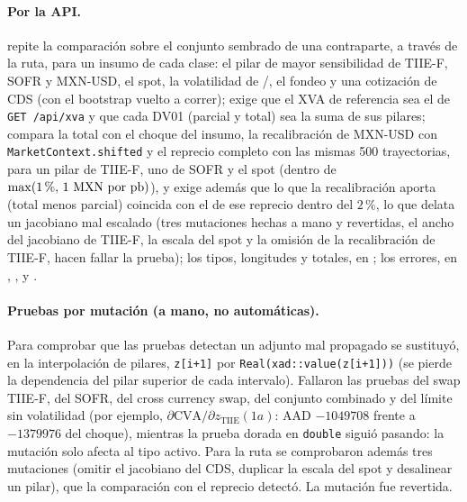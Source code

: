 \begin{sloppypar}
\paragraph{Por la API.} 
repite la comparación sobre el conjunto sembrado de una contraparte, a través de la ruta, para un insumo de cada
clase: el pilar de mayor sensibilidad de TIIE-F, SOFR y MXN-USD, el spot, la volatilidad de \USD/\MXN, el fondeo y
una cotización de CDS (con el bootstrap vuelto a correr); 
exige que el XVA de referencia sea el de \texttt{GET /api/xva} y que cada DV01 (parcial y total) sea la suma de sus pilares;
 compara la total con el
choque del insumo, la recalibración de MXN-USD con \texttt{MarketContext.shifted} y el reprecio completo con las mismas
500 trayectorias, para un pilar de TIIE-F, uno de SOFR y el spot (dentro de $\max(1\,\%,\,1~\textup{MXN}\text{ por }\textup{pb})$), y exige
además que lo que la recalibración aporta (total menos parcial) coincida con el de ese reprecio dentro del $2\,\%$, lo que
delata un jacobiano mal escalado (tres mutaciones hechas a mano y revertidas, el ancho del jacobiano de TIIE-F, la escala
del spot y la omisión de la recalibración de TIIE-F, hacen fallar la prueba); los
tipos, longitudes y totales, en ; los
errores, en ,
,
 y
.

\paragraph{Pruebas por mutación (a mano, no automáticas).} Para comprobar que las pruebas detectan un adjunto mal
propagado se sustituyó, en la interpolación de pilares, \texttt{z[i+1]} por \texttt{Real(xad::value(z[i+1]))}
(se pierde la dependencia del pilar superior de cada intervalo). Fallaron las pruebas del swap TIIE-F, del SOFR, del
cross currency swap, del conjunto combinado y del límite sin volatilidad (por ejemplo, $\partial\mathrm{CVA}/\partial z_{\mathrm{TIIE}}(1a)$:
AAD $-\num{1049708}$ frente a $-\num{1379976}$ del choque), mientras la prueba dorada en \texttt{double} siguió pasando: la
mutación solo afecta al tipo activo. Para la ruta se comprobaron además tres mutaciones (omitir el jacobiano del CDS,
duplicar la escala del spot y desalinear un pilar), que la comparación con el reprecio detectó. La mutación fue
revertida.


\end{sloppypar}

